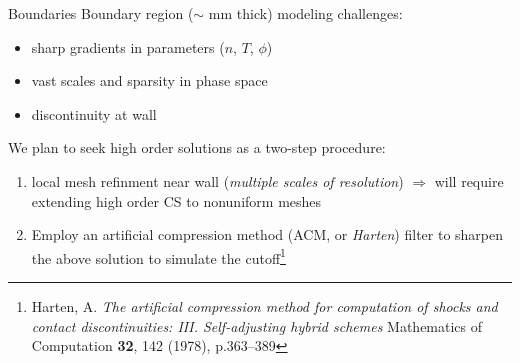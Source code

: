 \documentclass{beamer}
\begin{document}

\begin{frame}{Boundaries}
Boundary region ($\sim$ mm thick) modeling challenges:

\begin{itemize}
    \item sharp gradients in parameters ($n$, $T$, $\phi$)
    \item vast scales and sparsity in phase space
    \item discontinuity at wall
\end{itemize}

We plan to seek high order solutions as a two-step procedure:
\begin{enumerate}
    \item local mesh refinment near wall (\emph{multiple scales of resolution}) $\Rightarrow$ will require extending high order CS to nonuniform meshes
    \item Employ an artificial compression method (ACM, or \emph{Harten}) filter to sharpen the above solution to simulate the cutoff\footnote{Harten, A. \emph{The artificial compression method for computation of shocks and contact discontinuities: III. Self-adjusting hybrid schemes} Mathematics of Computation \textbf{32}, 142 (1978), p.363--389}
\end{enumerate} 

\end{frame}

\end{document}
